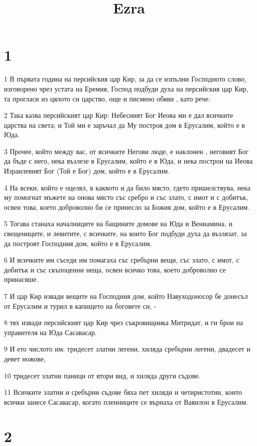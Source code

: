 

\title{Ezra}


\chapter{1}

\par 1 В първата година на персийския цар Кир, за да се изпълни Господното слово, изговорено чрез устата на Еремия, Господ подбуди духа на персийския цар Кир, та прогласи из цялото си царство, още и писмено обяви , като рече:
\par 2 Така казва персийският цар Кир: Небесният Бог Иеова ми е дал всичките царства на света; и Той ми е заръчал да Му построя дом в Ерусалим, който е в Юда.
\par 3 Прочее, който между вас, от всичките Негови люде, е наклонен , неговият Бог да бъде с него, нека възлезе в Ерусалим, който е в Юда, и нека построи на Иеова Израилевият Бог (Той е Бог) дом, който е в Ерусалим.
\par 4 На всеки, който е оцелял, в каквото и да било място, гдето пришелствува, нека му помогнат мъжете на онова място със сребро и със злато, с имот и с добитък, освен това, което доброволно би се принесло за Божия дом, който е в Ерусалим.
\par 5 Тогава станаха началниците на бащините домове на Юда и Вениамина, и свещениците, и левитите, с всичките, на които Бог подбуди духа да възлязат, за да построят Господния дом, който е в Ерусалим.
\par 6 И всичките им съседи им помагаха със сребърни вещи, със злато, с имот, с добитък и със скъпоценни неща, освен всичко това, което доброволно се принасяше.
\par 7 И цар Кир извади вещите на Господния дом, който Навуходоносор бе донесъл от Ерусалим и турил в капището на боговете си, -
\par 8 тях извади персийският цар Кир чрез съкровищника Митридат, и ги брои на управителя на Юда Сасавасар.
\par 9 И ето числото им: тридесет златни легени, хиляда сребърни легени, двадесет и девет ножове,
\par 10 тридесет златни паници от втори вид, и хиляда други съдове.
\par 11 Всичките златни и сребърни съдове бяха пет хиляди и четиристотин, които всички занесе Сасавасар, когато пленниците се върнаха от Вавилон в Ерусалим.

\chapter{2}

